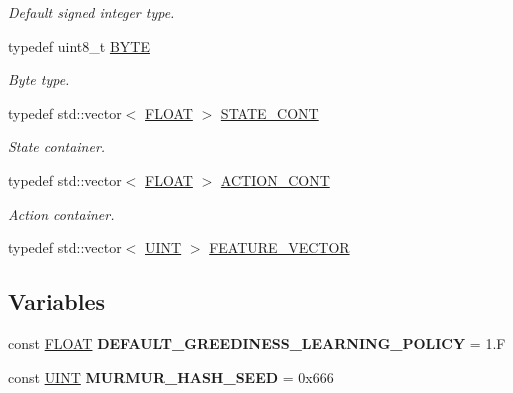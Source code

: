 \begin{DoxyCompactItemize}
\begin{DoxyCompactList}\small\item\em Default signed integer type. \end{DoxyCompactList}\item 
\hypertarget{namespaceAI_a9d4bcda82fe0f9aac3c4861e24491581}{typedef uint8\+\_\+t \hyperlink{namespaceAI_a9d4bcda82fe0f9aac3c4861e24491581}{B\+Y\+T\+E}}\label{namespaceAI_a9d4bcda82fe0f9aac3c4861e24491581}

\begin{DoxyCompactList}\small\item\em Byte type. \end{DoxyCompactList}\item 
\hypertarget{namespaceAI_aff63ec21d97dd5f086fddbc3103f5707}{typedef std\+::vector$<$ \hyperlink{namespaceAI_a41b74884a20833db653dded3918e05c3}{F\+L\+O\+A\+T} $>$ \hyperlink{namespaceAI_aff63ec21d97dd5f086fddbc3103f5707}{S\+T\+A\+T\+E\+\_\+\+C\+O\+N\+T}}\label{namespaceAI_aff63ec21d97dd5f086fddbc3103f5707}

\begin{DoxyCompactList}\small\item\em State container. \end{DoxyCompactList}\item 
\hypertarget{namespaceAI_a143ffd7216e2cf8fc6d92e4efdb647a7}{typedef std\+::vector$<$ \hyperlink{namespaceAI_a41b74884a20833db653dded3918e05c3}{F\+L\+O\+A\+T} $>$ \hyperlink{namespaceAI_a143ffd7216e2cf8fc6d92e4efdb647a7}{A\+C\+T\+I\+O\+N\+\_\+\+C\+O\+N\+T}}\label{namespaceAI_a143ffd7216e2cf8fc6d92e4efdb647a7}

\begin{DoxyCompactList}\small\item\em Action container. \end{DoxyCompactList}\item 
typedef std\+::vector$<$ \hyperlink{namespaceAI_ab6e14dc1e659854858a87e511f1439ec}{U\+I\+N\+T} $>$ \hyperlink{namespaceAI_a23a39e1b301a5c1345fa508796940631}{F\+E\+A\+T\+U\+R\+E\+\_\+\+V\+E\+C\+T\+O\+R}
\end{DoxyCompactItemize}
\subsection*{Variables}
\begin{DoxyCompactItemize}
\item 
\hypertarget{namespaceAI_a939c510628efeee2f78c708718653f19}{const \hyperlink{namespaceAI_a41b74884a20833db653dded3918e05c3}{F\+L\+O\+A\+T} {\bfseries D\+E\+F\+A\+U\+L\+T\+\_\+\+G\+R\+E\+E\+D\+I\+N\+E\+S\+S\+\_\+\+L\+E\+A\+R\+N\+I\+N\+G\+\_\+\+P\+O\+L\+I\+C\+Y} = 1.\+F}\label{namespaceAI_a939c510628efeee2f78c708718653f19}

\item 
\hypertarget{namespaceAI_a8909739449117cea825e57ded425e597}{const \hyperlink{namespaceAI_ab6e14dc1e659854858a87e511f1439ec}{U\+I\+N\+T} {\bfseries M\+U\+R\+M\+U\+R\+\_\+\+H\+A\+S\+H\+\_\+\+S\+E\+E\+D} = 0x666}\label{namespaceAI_a8909739449117cea825e57ded425e597}

\end{DoxyCompactItemize}


